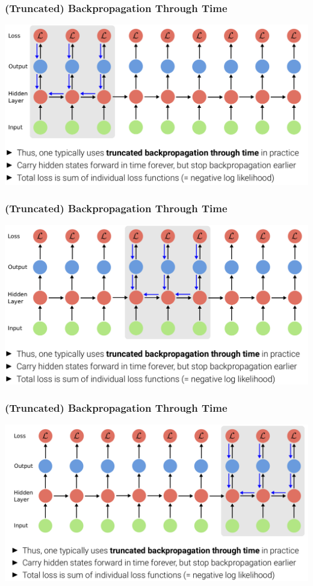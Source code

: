 \documentclass[10pt]{beamer}
\begin{document}
\begin{frame}
  \frametitle{(Truncated) Backpropagation Through Time}
\begin{center}
\includegraphics[width=\textwidth]{images/s7}
\end{center}
\end{frame}


\begin{frame}
  \frametitle{(Truncated) Backpropagation Through Time}
\begin{center}
\includegraphics[width=\textwidth]{images/s8}
\end{center}
\end{frame}


\begin{frame}
  \frametitle{(Truncated) Backpropagation Through Time}
\begin{center}
\includegraphics[width=\textwidth]{images/s9}
\end{center}
\end{frame}
\end{document}
